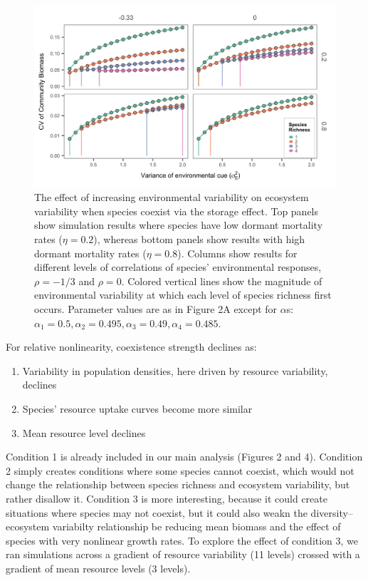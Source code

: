 \documentclass[11pt,]{article}
\providecommand{\tightlist}{%
  \setlength{\itemsep}{0pt}\setlength{\parskip}{0pt}}
\begin{document}
\begin{figure}[!ht]
  \centering
      \includegraphics[width=6in]{./components/SI_storage_effect_two_etas.png}
  \caption{The effect of increasing environmental variability on ecosystem variability when species coexist via the storage effect. Top panels show simulation results where species have low dormant mortality rates ($\eta = 0.2$), whereas bottom panels show results with high dormant mortality rates ($\eta = 0.8$). Columns show results for different levels of correlations of species' environmental responses, $\rho = -1/3$ and $\rho = 0$. Colored vertical lines show the magnitude of environmental variability at which each level of species richness first occurs. Parameter values are as in Figure 2A except for $\alpha$s: $\alpha_1 = 0.5, \alpha_2 = 0.495, \alpha_3 = 0.49, \alpha_4 = 0.485$.}
\end{figure}

For relative nonlinearity, coexistence strength declines as:

\begin{enumerate}
\def\labelenumi{\arabic{enumi}.}
\tightlist
\item
  Variability in population densities, here driven by resource
  variability, declines
\item
  Species' resource uptake curves become more similar
\item
  Mean resource level declines
\end{enumerate}

Condition 1 is already included in our main analysis (Figures 2 and 4).
Condition 2 simply creates conditions where some species cannot coexist,
which would not change the relationship between species richness and
ecosystem variability, but rather disallow it. Condition 3 is more
interesting, because it could create situations where species may not
coexist, but it could also weakn the diversity--ecosystem variabilty
relationship be reducing mean biomass and the effect of species with
very nonlinear growth rates. To explore the effect of condition 3, we
ran simulations across a gradient of resource variability (11 levels)
crossed with a gradient of mean resource levels (3 levels).
\end{document}
